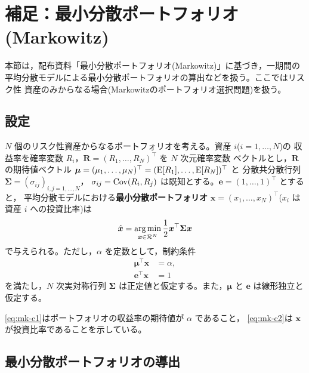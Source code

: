 \vspace{18pt}

\section{補足：最小分散ポートフォリオ(Markowitz)}

本節は，配布資料「最小分散ポートフォリオ(Markowitz)」に基づき，一期間の
平均分散モデルによる最小分散ポートフォリオの算出などを扱う。ここではリスク性
資産のみからなる場合(Markowitzのポートフォリオ選択問題)を扱う。

\subsection{設定}

$N$ 個のリスク性資産からなるポートフォリオを考える。資産 $i$($i=1,\dots,N$)の
収益率を確率変数 $R_i$，$\bm{R} = (R_1,\dots,R_N)^\top$ を $N$ 次元確率変数
ベクトルとし，$\bm{R}$ の期待値ベクトル
$\bm{\mu} = (\mu_1,\dots,\mu_N)^\top = (\mathrm{E}[R_1],\dots,\mathrm{E}[R_N])^\top$ と
分散共分散行列 $\bm{\Sigma} = (\sigma_{ij})_{i,j=1,\dots,N}$，
$\sigma_{ij} = \mathrm{Cov}(R_i,R_j)$ は既知とする。$\bm{e} = (1,\dots,1)^\top$ とすると，
平均分散モデルにおける\textbf{最小分散ポートフォリオ}
$\bm{x} = (x_1,\dots,x_N)^\top$($x_i$ は資産 $i$ への投資比率)は
\begin{equation}
\hat{\bm{x}} = \operatorname*{arg\,min}_{\bm{x}\in\mathcal{R}^N}
\frac{1}{2}\bm{x}^\top\bm{\Sigma}\bm{x}
\label{eq:mk-problem}
\end{equation}
で与えられる。ただし，$\alpha$ を定数として，制約条件
\begin{align}
\bm{\mu}^\top\bm{x} &= \alpha,
\label{eq:mk-c1}\\
\bm{e}^\top\bm{x} &= 1
\label{eq:mk-c2}
\end{align}
を満たし，$N$ 次実対称行列 $\bm{\Sigma}$ は正定値と仮定する。また，$\bm{\mu}$ と
$\bm{e}$ は線形独立と仮定する。

\begin{remark}
\eqref{eq:mk-c1}はポートフォリオの収益率の期待値が $\alpha$ であること，
\eqref{eq:mk-c2}は $\bm{x}$ が投資比率であることを示している。
\end{remark}

\vspace{18pt}

\subsection{最小分散ポートフォリオの導出}

